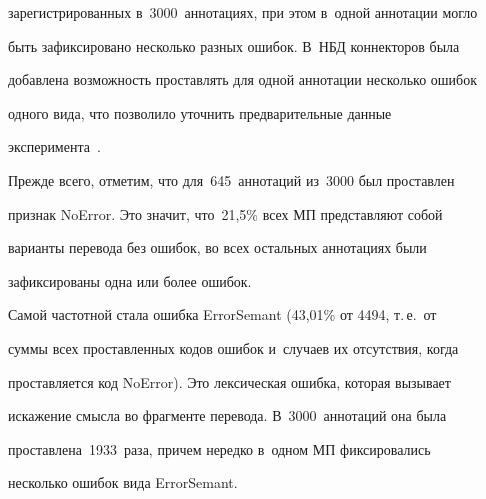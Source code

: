 зарегистрированных в~3000~аннотациях, при этом в~одной аннотации могло 


быть зафиксировано несколько разных ошибок. В~НБД коннекторов была 


добавлена воз\-мож\-ность про\-став\-лять для одной аннотации несколько ошибок 


одного вида, что позволило уточнить предварительные данные 


эксперимента~\cite{17-ez}.








   





   


   Прежде всего, отметим, что для~645~аннотаций из~3000 был проставлен 


признак NoError. Это значит, что~21,5\% всех МП пред\-став\-ля\-ют собой 


варианты перевода без ошибок, во всех остальных аннотациях были 


зафиксированы одна или более ошибок.








   


   Самой частотной стала ошибка ErrorSemant (43,01\% от 4494, т.\,е.\ от 


суммы всех проставленных кодов ошибок и~случаев их отсутствия, когда 


проставляется код NoError). Это лексическая ошибка, которая вызывает 


искажение смыс\-ла во фрагменте перевода. В~3000~аннотаций она была 


про\-став\-ле\-на~1933~раза, причем нередко в~одном МП фиксировались 


несколько ошибок вида ErrorSemant.


   


   


